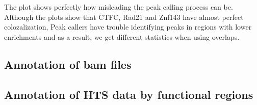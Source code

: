 \documentclass{article}\usepackage[]{graphicx}\usepackage[]{color}
\begin{document}
The plot shows perfectly how misleading the peak calling process can be. 
Although the plots show that CTFC, Rad21 and Znf143 have almost perfect colozalization,
Peak callers have trouble identifying peaks in regions with lower enrichments and as a 
result, we get different statistics when using overlaps.

\subsection{Annotation of bam files}


\subsection{Annotation of HTS data by functional regions}
\end{document}
